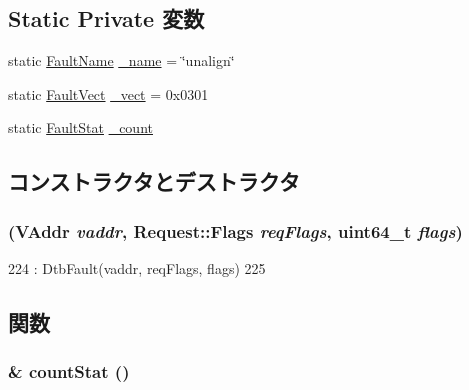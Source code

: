 \subsection*{Static Private 変数}
\begin{DoxyCompactItemize}
\item 
static \hyperlink{sim_2faults_8hh_abb196df64725e5c2568c900cf130d8d7}{FaultName} \hyperlink{classAlphaISA_1_1DtbAlignmentFault_ac79073ffcd2c66a09bcd3bd3ad206019}{\_\-name} = \char`\"{}unalign\char`\"{}
\item 
static \hyperlink{classm5_1_1params_1_1Addr}{FaultVect} \hyperlink{classAlphaISA_1_1DtbAlignmentFault_ad9e5855b9db0b2824cf6c507be4a872e}{\_\-vect} = 0x0301
\item 
static \hyperlink{classStats_1_1Scalar}{FaultStat} \hyperlink{classAlphaISA_1_1DtbAlignmentFault_a4bff925c412f331c5aaf6a39b79619ff}{\_\-count}
\end{DoxyCompactItemize}


\subsection{コンストラクタとデストラクタ}
\hypertarget{classAlphaISA_1_1DtbAlignmentFault_ad19c673ddedc51c81895670922fff3ce}{
\subsubsection[{DtbAlignmentFault}]{ ({\bf VAddr} {\em vaddr}, \/  {\bf Request::Flags} {\em reqFlags}, \/  uint64\_\-t {\em flags})}}
\label{classAlphaISA_1_1DtbAlignmentFault_ad19c673ddedc51c81895670922fff3ce}



\begin{DoxyCode}
224         : DtbFault(vaddr, reqFlags, flags)
225     { }
\end{DoxyCode}


\subsection{関数}
\hypertarget{classAlphaISA_1_1DtbAlignmentFault_a6c79663c761ff57265459f7e3aefaf4c}{
\subsubsection[{countStat}]{\& countStat ()}}
\label{classAlphaISA_1_1DtbAlignmentFault_a6c79663c761ff57265459f7e3aefaf4c}


